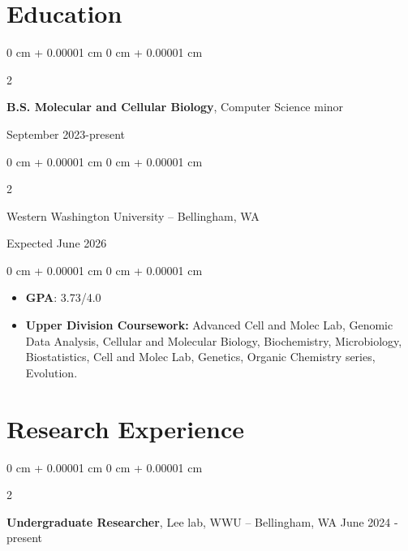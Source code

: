 \documentclass[10pt, article]{article}
\newenvironment{highlights}{
    \begin{itemize}[
        topsep=0.10 cm,
        parsep=0.10 cm,
        partopsep=0pt,
        itemsep=0pt,
        leftmargin=0 cm + 10pt
    ]
}{
    \end{itemize}
} %
\newenvironment{onecolentry}{
    \begin{adjustwidth}{
        0 cm + 0.00001 cm
    }{
        0 cm + 0.00001 cm
    }
}{
    \end{adjustwidth}
} %
\newenvironment{twocolentry}[2][]{
    \onecolentry
    \def\secondColumn{#2}
    \setcolumnwidth{\fill, 4.5 cm}
    \begin{paracol}{2}
}{
    \switchcolumn \raggedleft \secondColumn
    \end{paracol}
    \endonecolentry
} %
\begin{document}
    \section{Education}




        \begin{twocolentry}{
            September 2023-present}
          \textbf{B.S. Molecular and Cellular Biology}, Computer Science minor 
        \end{twocolentry}
        \begin{twocolentry}{
            Expected June 2026
        }
            Western Washington University -- Bellingham, WA 

        \end{twocolentry}

        \begin{onecolentry}
            \begin{highlights}
            \item \textbf{GPA}: 3.73/4.0 %
                \item \textbf{Upper Division Coursework:} Advanced Cell and Molec Lab, Genomic Data Analysis, Cellular and Molecular Biology, Biochemistry, Microbiology, Biostatistics, Cell and Molec Lab, Genetics, Organic Chemistry series, Evolution.

            \end{highlights}
        \end{onecolentry}




    \section{Research Experience}




        \begin{twocolentry}{
            June 2024 - present
        }
            \textbf{Undergraduate Researcher}, Lee lab, WWU -- Bellingham, WA\end{twocolentry}
\end{document}
